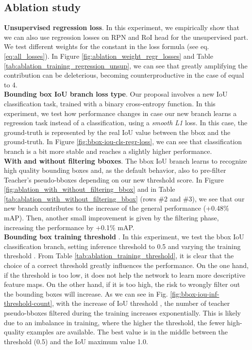 \subsection{Ablation study}
\label{ablation-study}

\noindent\textbf{Unsupervised regression loss}.
In this experiment, we empirically show that we can also use regression losses on RPN and RoI head for the unsupervised part.
We test different weights for the constant  in the loss formula (see eq. \ref{eq:all_losses}).
In Figure \ref{fig:ablation_weight_regr_losses} and Table \ref{tab:ablation_training_regression_unsup}, we can see that greatly amplifying the contribution can be deleterious, becoming counterproductive in the case of  equal to 4.\\

\noindent\textbf{Bounding box IoU branch loss type}.
Our proposal involves a new IoU classification task, trained with a binary cross-entropy function.
In this experiment, we test how performance changes in case our new branch learns a regression task instead of a classification, using a \textit{smooth L1} loss.
In this case, the ground-truth is represented by the real IoU value between the bbox and the ground-truth.
In Figure \ref{fig:bbox-iou-cls-regr-loss}, we can see that classification branch is a bit more stable and reaches a slightly higher performance.\\

\noindent\textbf{With and without filtering bboxes}.
The bbox IoU branch learns to recognize high quality bounding boxes and, as the default behavior, also to pre-filter Teacher's pseudo-bboxes depending on our new threshold score.
In Figure \ref{fig:ablation_with_without_filtering_bbox} and in Table \ref{tab:ablation_with_without_filtering_bbox} (rows \#2 and \#3), we see that our new branch contributes to the increase of the general performance (+0.48\% mAP).
Then, another small improvement is given by the filtering phase, increasing the performance by +0.1\% mAP.\\

\noindent\textbf{Bounding box training threshold }.
In this experiment, we test the bbox IoU classification branch, setting inference threshold  to 0.5 and varying the training threshold .
From Table \ref{tab:ablation_training_threshold}, it is clear that the choice of a correct threshold greatly influences the performance. On the one hand, if the threshold is too low, it does not help the network to learn more descriptive feature maps. On the other hand, if it is too high, the risk to wrongly filter out the bounding boxes will increase.
As we can see in Fig. \ref{fig:bbox-iou-inf-threshold-count}, with the increase of IoU threshold , the number of teacher pseudo-bboxes filtered during the training increases exponentially.
This is likely due to an imbalance in training, where the higher the threshold, the fewer high-quality examples are available.
The best value is in the middle between the threshold  (0.5) and the IoU maximum value 1.0.


